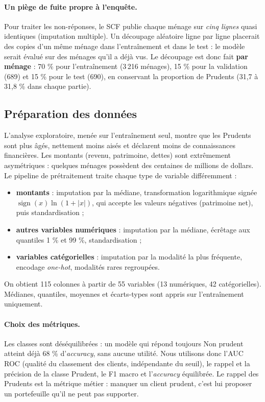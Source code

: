 \paragraph{Un piège de fuite propre à l'enquête.} Pour traiter les non-réponses, le SCF publie chaque ménage sur \emph{cinq lignes} quasi identiques (imputation multiple). Un découpage aléatoire ligne par ligne placerait des copies d'un même ménage dans l'entraînement et dans le test : le modèle serait évalué sur des ménages qu'il a déjà vus. Le découpage est donc fait \textbf{par ménage} : 70 \% pour l'entraînement (3\,216 ménages), 15 \% pour la validation (689) et 15 \% pour le test (690), en conservant la proportion de Prudents (31,7 à 31,8 \% dans chaque partie).

\subsection{Préparation des données}

L'analyse exploratoire, menée sur l'entraînement seul, montre que les Prudents sont plus âgés, nettement moins aisés et déclarent moins de connaissances financières. Les montants (revenu, patrimoine, dettes) sont extrêmement asymétriques : quelques ménages possèdent des centaines de millions de dollars. Le pipeline de prétraitement traite chaque type de variable différemment :
\begin{itemize}
  \item \textbf{montants} : imputation par la médiane, transformation logarithmique signée $\operatorname{sign}(x)\ln(1+|x|)$, qui accepte les valeurs négatives (patrimoine net), puis standardisation ;
  \item \textbf{autres variables numériques} : imputation par la médiane, écrêtage aux quantiles 1 \% et 99 \%, standardisation ;
  \item \textbf{variables catégorielles} : imputation par la modalité la plus fréquente, encodage \emph{one-hot}, modalités rares regroupées.
\end{itemize}
On obtient 115 colonnes à partir de 55 variables (13 numériques, 42 catégorielles). Médianes, quantiles, moyennes et écarts-types sont appris sur l'entraînement uniquement.

\paragraph{Choix des métriques.} Les classes sont déséquilibrées : un modèle qui répond toujours \og Non prudent \fg{} atteint déjà 68 \% d'\emph{accuracy}, sans aucune utilité. Nous utilisons donc l'AUC ROC (qualité du classement des clients, indépendante du seuil), le rappel et la précision de la classe Prudent, le F1 macro et l'\emph{accuracy} équilibrée. Le rappel des Prudents est la métrique métier : manquer un client prudent, c'est lui proposer un portefeuille qu'il ne peut pas supporter.

